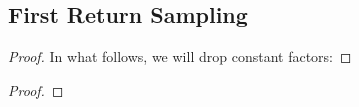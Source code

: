 \subsection{First Return Sampling}%
\label{sub:first_return_sampling}

\ReturnDLeftBound*
\begin{proof}
In what follows, we will drop constant factors:
\end{proof}


\ReturnDRightBound*
\begin{proof}

\end{proof}

